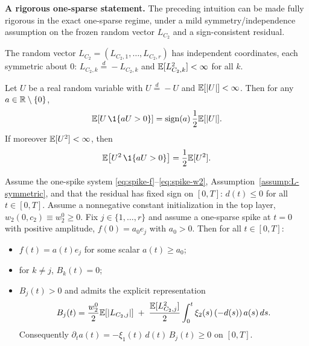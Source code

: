 \medskip
\noindent\textbf{A rigorous one-sparse statement.}
The preceding intuition can be made fully rigorous in the exact one-sparse regime, under a mild symmetry/independence assumption on the frozen random vector $L_{C_2}$ and a sign-consistent residual.

\begin{assumption}\label{assump:L-symmetric}
\openflag
The random vector $L_{C_2}=(L_{C_2,1},\dots,L_{C_2,r})$ has independent coordinates, each symmetric about $0$:
$L_{C_2,k}\overset{d}{=}-L_{C_2,k}$ and $\mathbb{E}[L_{C_2,k}^2]<\infty$ for all $k$.
\end{assumption}

\begin{lemma}\label{lem:halfspace-identities}
\provedflag
Let $U$ be a real random variable with $U\overset{d}{=}-U$ and $\mathbb{E}[|U|]<\infty$.
Then for any $a\in\mathbb{R}\setminus\{0\}$,
\[
\E\!\left[U\,\1\{aU>0\}\right]=\mathrm{sign}(a)\,\frac{1}{2}\E[|U|].
\]
If moreover $\mathbb{E}[U^2]<\infty$, then
\[
\E\!\left[U^2\,\1\{aU>0\}\right]=\frac{1}{2}\E[U^2].
\]
\end{lemma}

\begin{lemma}\label{lem:onesparse-reinforce}
\provedflag
Assume the one-spike system \eqref{eq:spike-f}--\eqref{eq:spike-w2}, Assumption~\ref{assump:L-symmetric}, and that the residual has fixed sign on $[0,T]$:
$d(t)\le 0$ for all $t\in[0,T]$.
Assume a nonnegative constant initialization in the top layer, $w_2(0,c_2)\equiv w_2^0\ge 0$.
Fix $j\in\{1,\dots,r\}$ and assume a one-sparse spike at $t=0$ with positive amplitude,
$f(0)=a_0e_j$ with $a_0>0$.
Then for all $t\in[0,T]$:
\begin{itemize}
\item $f(t)=a(t)e_j$ for some scalar $a(t)\ge a_0$;
\item for $k\neq j$, $B_k(t)=0$;
\item $B_j(t)>0$ and admits the explicit representation
\begin{equation}\label{eq:Bj-explicit}
B_j(t)=\frac{w_2^0}{2}\mathbb{E}[|L_{C_2,j}|]\;+\;\frac{\mathbb{E}[L_{C_2,j}^2]}{2}\int_0^t \xi_2(s)\,(-d(s))\,a(s)\,ds.
\end{equation}
Consequently $\partial_t a(t)=-\xi_1(t)\,d(t)\,B_j(t)\ge 0$ on $[0,T]$.
\end{itemize}
\end{lemma}

